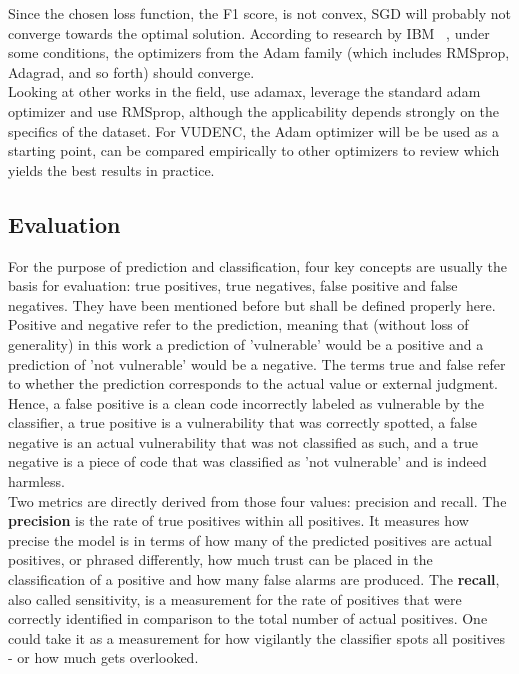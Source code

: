 \documentclass[
a4paper,
pagesize,
pdftex,
12pt,
twoside, %
BCOR=5mm, %
ngerman,
fleqn,
final,
]{scrartcl}
\begin{document}
	Since the chosen loss function, the F1 score, is not convex, SGD will probably not converge towards the optimal solution. According to research by IBM ~\cite{IBMResearchEditorialStaff.6.5.2019}, under some conditions, the optimizers from the Adam family (which includes RMSprop, Adagrad, and so forth) should converge.\\
	Looking at other works in the field, \cite{Li.2018} use adamax, \cite{Russell.2018} leverage the standard adam optimizer and \cite{Dam.2017} use RMSprop, although the applicability depends strongly on the specifics of the dataset. For VUDENC, the Adam optimizer will be be used as a starting point, can be compared empirically to other optimizers to review which yields the best results in practice.
	
	\subsection{Evaluation}\label{Evaluation}
	For the purpose of prediction and classification, four key concepts are usually the basis for evaluation: true positives, true negatives, false positive and false negatives. They have been mentioned before but shall be defined properly here. Positive and negative refer to the prediction, meaning that (without loss of generality) in this work a prediction of 'vulnerable' would be a positive and a prediction of 'not vulnerable' would be a negative. The terms true and false refer to whether the prediction corresponds to the actual value or external judgment. Hence, a false positive is a clean code incorrectly labeled as vulnerable by the classifier, a true positive is a vulnerability that was correctly spotted, a false negative is an actual vulnerability that was not classified as such, and a true negative is a piece of code that was classified as 'not vulnerable' and is indeed harmless.\\
	Two metrics are directly derived from those four values: precision and recall. The \textbf{precision} is the rate of true positives within all positives. It measures how precise the model is in terms of how many of the predicted positives are actual positives, or phrased differently, how much trust can be placed in the classification of a positive and how many false alarms are produced. The \textbf{recall}, also called sensitivity, is a measurement for the rate of positives that were correctly identified in comparison to the total number of actual positives. One could take it as a measurement for how vigilantly the classifier spots all positives - or how much gets overlooked.\newline
\end{document}
